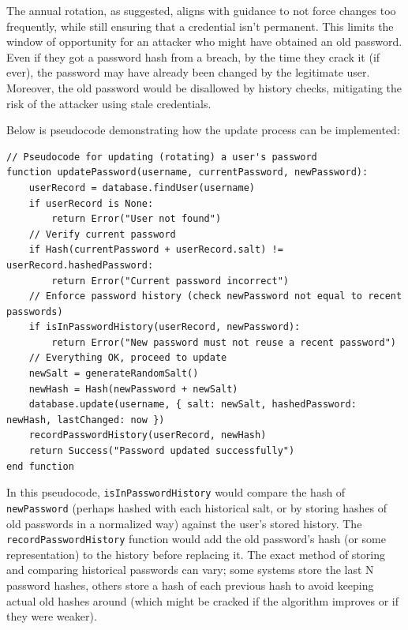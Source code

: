 \documentclass[11pt]{article}
\begin{document}
The annual rotation, as suggested, aligns with guidance to not force changes too frequently, while still ensuring that a credential isn’t permanent. This limits the window of opportunity for an attacker who might have obtained an old password. Even if they got a password hash from a breach, by the time they crack it (if ever), the password may have already been changed by the legitimate user. Moreover, the old password would be disallowed by history checks, mitigating the risk of the attacker using stale credentials.

Below is pseudocode demonstrating how the update process can be implemented:

\begin{lstlisting}
// Pseudocode for updating (rotating) a user's password
function updatePassword(username, currentPassword, newPassword):
    userRecord = database.findUser(username)
    if userRecord is None:
        return Error("User not found")
    // Verify current password
    if Hash(currentPassword + userRecord.salt) != userRecord.hashedPassword:
        return Error("Current password incorrect")
    // Enforce password history (check newPassword not equal to recent passwords)
    if isInPasswordHistory(userRecord, newPassword):
        return Error("New password must not reuse a recent password")
    // Everything OK, proceed to update
    newSalt = generateRandomSalt()
    newHash = Hash(newPassword + newSalt)
    database.update(username, { salt: newSalt, hashedPassword: newHash, lastChanged: now })
    recordPasswordHistory(userRecord, newHash)
    return Success("Password updated successfully")
end function
\end{lstlisting}

In this pseudocode, \texttt{isInPasswordHistory} would compare the hash of \texttt{newPassword} (perhaps hashed with each historical salt, or by storing hashes of old passwords in a normalized way) against the user's stored history. The \texttt{recordPasswordHistory} function would add the old password's hash (or some representation) to the history before replacing it. The exact method of storing and comparing historical passwords can vary; some systems store the last N password hashes, others store a hash of each previous hash to avoid keeping actual old hashes around (which might be cracked if the algorithm improves or if they were weaker).
\end{document}
